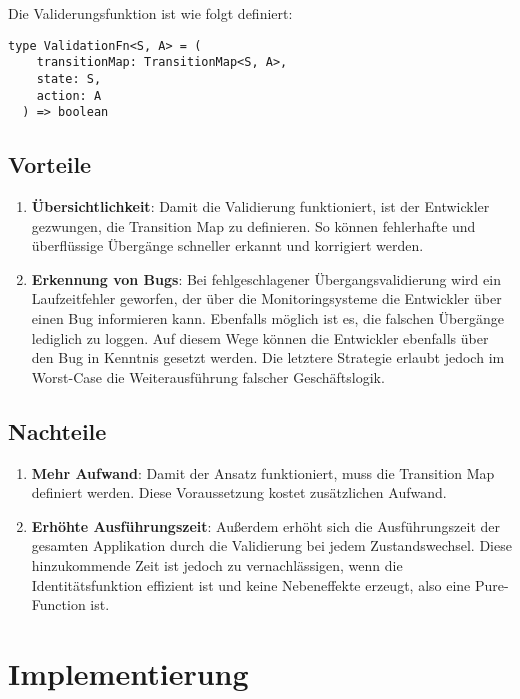 
Die Validerungsfunktion ist wie folgt definiert:

\begin{lstlisting}
type ValidationFn<S, A> = (
    transitionMap: TransitionMap<S, A>,
    state: S,
    action: A
  ) => boolean
\end{lstlisting}

\subsection{Vorteile}

\begin{enumerate}
  \item \textbf{Übersichtlichkeit}: Damit die Validierung funktioniert, ist der Entwickler gezwungen, die Transition Map zu definieren. So können fehlerhafte und überflüssige Übergänge schneller erkannt und korrigiert werden.
  \item \textbf{Erkennung von Bugs}: Bei fehlgeschlagener Übergangsvalidierung wird ein Laufzeitfehler geworfen, der über die Monitoringsysteme die Entwickler über einen Bug informieren kann. Ebenfalls möglich ist es, die falschen Übergänge lediglich zu loggen. Auf diesem Wege können die Entwickler ebenfalls über den Bug in Kenntnis gesetzt werden. Die letztere Strategie erlaubt jedoch im Worst-Case die Weiterausführung falscher Geschäftslogik.
\end{enumerate}

\subsection{Nachteile}

\begin{enumerate}
  \item \textbf{Mehr Aufwand}: Damit der Ansatz funktioniert, muss die Transition Map definiert werden. Diese Voraussetzung kostet zusätzlichen Aufwand.
  \item \textbf{Erhöhte Ausführungszeit}: Außerdem erhöht sich die Ausführungszeit der gesamten Applikation durch die Validierung bei jedem Zustandswechsel. Diese hinzukommende Zeit ist jedoch zu vernachlässigen, wenn die Identitätsfunktion effizient ist und keine Nebeneffekte erzeugt, also eine Pure-Function ist.
\end{enumerate}

\section{Implementierung}

